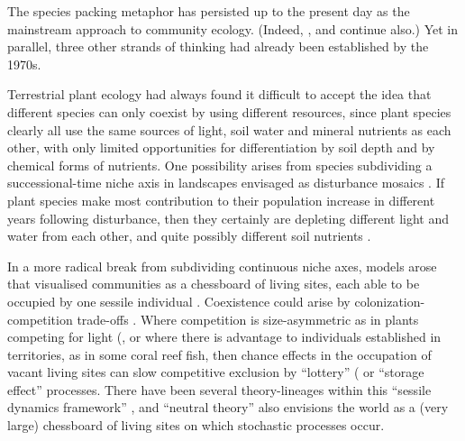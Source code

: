 \documentclass[a4paper,11pt]{article}
\begin{document}
The species packing metaphor has persisted up to the present day as the mainstream approach to community ecology. (Indeed,  \citet{Krebs-2013}, \citet{Ricklefs-1999} and \citet{Pianka-1999} continue also.) Yet in parallel, three other strands of thinking had already been established by the 1970s.

Terrestrial plant ecology had always found it difficult to accept the idea that different species can only coexist by using different resources, since plant species clearly all use the same sources of light, soil water and mineral nutrients as each other, with only limited opportunities for differentiation by soil depth and by chemical forms of nutrients. One possibility arises from species subdividing a successional-time niche axis in landscapes envisaged as disturbance mosaics \citep{Connell-1978}. If plant species make most contribution to their population increase in different years following disturbance, then they certainly are depleting different light and water from each other, and quite possibly different soil nutrients \citep{Huston-1987, Kohyama-1993}.

In a more radical break from subdividing continuous niche axes, models arose that
visualised communities as a chessboard of living sites, each able to be occupied by one sessile individual \citep{Yodzis-1978}. Coexistence could arise by colonization-competition trade-offs \citep{Levins-1969,Levins-1971}. Where competition is size-asymmetric as in plants competing for light (\citep{Harper-1977,Weiner-1990}, or where there is advantage to individuals established in territories, as in some coral reef fish, then chance effects in the occupation of vacant living sites can slow competitive exclusion by ``lottery'' \citep{Sale-1977}( or ``storage effect'' \citep{Chesson-1981} processes. There have been several theory-lineages within this ``sessile dynamics framework'' \citep{Fagerstrom-1997}, and ``neutral theory'' \citep{Hubbell-2001} also envisions the world as a (very large) chessboard of living sites on which stochastic processes occur.
\end{document}
